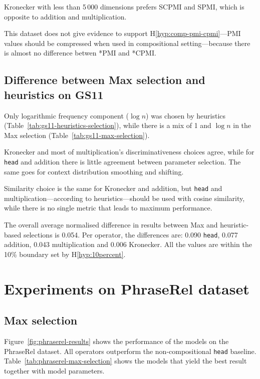 Kronecker with less than 5\,000 dimensions prefers SCPMI and SPMI, which is opposite to addition and multiplication.

This dataset does not give evidence to support H\ref{hyp:comp-pmi-cpmi}---PMI values should be compressed when used in compositional setting---because there is almost no difference betwen *PMI and *CPMI.

\subsection{Difference between Max selection and heuristics on GS11}

Only logarithmic frequency component ($\log n$) was chosen by heuristics (Table~\ref{tab:gs11-heuristics-selection}), while there is a mix of 1 and $\log n$ in the Max selection (Table~\ref{tab:gs11-max-selection}).

Kronecker and most of multiplication's discriminativeness choices agree, while for \texttt{head} and addition there is little agreement between parameter selection. The same goes for context distribution smoothing and shifting.

Similarity choice is the same for Kronecker and addition, but \texttt{head} and multiplication---according to heuristics---should be used with cosine similarity, while there is no single metric that leads to maximum performance.

The overall average normalised difference in results between Max and heuristic-based selections is 0.054. Per operator, the differences are: 0.090 \texttt{head}, 0.077 addition, 0.043 multiplication and 0.006 Kronecker. All the values are within the 10\% boundary set by H\ref{hyp:10percent}.

\section{Experiments on PhraseRel dataset}
\label{sec:phraserel-experiment}

\subsection{Max selection}
\label{sec:max-selection-phraserel}



Figure~\ref{fig:phraserel-results} shows the performance of the models on the PhraseRel dataset. All operators outperform the non-compositional \texttt{head} baseline. Table~\ref{tab:phraserel-max-selection} shows the models that yield the best result together with model parameters.

